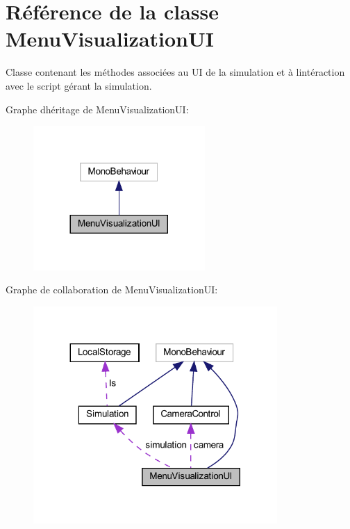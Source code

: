 \hypertarget{class_menu_visualization_u_i}{}\section{Référence de la classe Menu\+Visualization\+UI}
\label{class_menu_visualization_u_i}


Classe contenant les méthodes associées au UI de la simulation et à l\textquotesingle{}intéraction avec le script gérant la simulation.  




Graphe d\textquotesingle{}héritage de Menu\+Visualization\+UI\+:\nopagebreak
\begin{figure}[H]
\begin{center}
\leavevmode
\includegraphics[width=185pt]{class_menu_visualization_u_i__inherit__graph}
\end{center}
\end{figure}


Graphe de collaboration de Menu\+Visualization\+UI\+:
\nopagebreak
\begin{figure}[H]
\begin{center}
\leavevmode
\includegraphics[width=263pt]{class_menu_visualization_u_i__coll__graph}
\end{center}
\end{figure}

